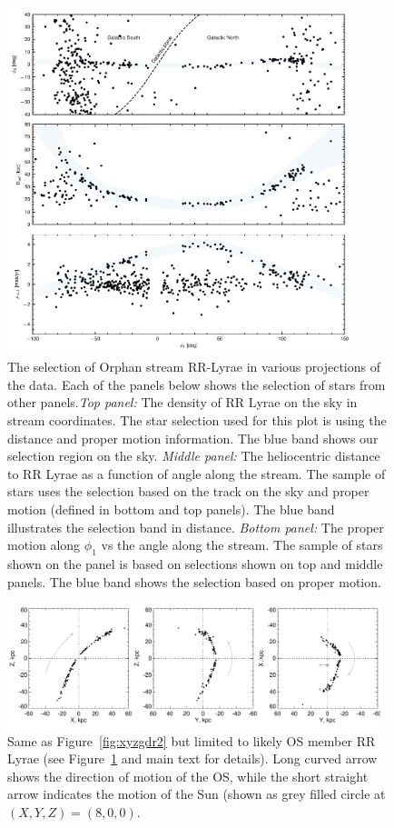 \documentclass[a4paper,useAMS,usenatbib]{mnras}
\begin{document}
%
\begin{figure}
  \centering
  \includegraphics[width=0.9\textwidth]{rrlyrae_selection_plot.pdf}
  \caption[]{The selection of Orphan stream RR-Lyrae in various
    projections of the data. Each of the panels below shows the
    selection of stars from other panels.{\it Top panel:} The density
    of RR Lyrae on the sky in stream coordinates. The star selection
    used for this plot is using the distance and proper motion
    information. The blue band shows our selection region on the
    sky. {\it Middle panel:} The heliocentric distance to RR Lyrae as
    a function of angle along the stream. The sample of stars uses the
    selection based on the track on the sky and proper motion (defined
    in bottom and top panels). The blue band illustrates the selection
    band in distance. {\it Bottom panel:} The proper motion along
    $\phi_1$ vs the angle along the stream. The sample of stars shown
    on the panel is based on selections shown on top and middle
    panels. The blue band shows the selection based on proper motion.
  }
   \label{fig:selection}
\end{figure}
%

%
\begin{figure}
  \centering
  \includegraphics[width=0.97\textwidth]{orphan_paper_xyz_members.pdf}
  \caption[]{Same as Figure~\ref{fig:xyzgdr2} but limited to likely OS
    member RR Lyrae (see Figure~\ref{fig:selection} and main text for
    details). Long curved arrow shows the direction of motion of the
    OS, while the short straight arrow indicates the motion of the Sun
    (shown as grey filled circle at $(X,Y,Z)=(8,0,0)$.}
   \label{fig:xyzmem}
\end{figure}
%
\end{document}
